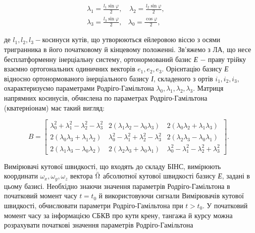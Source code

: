 \[\begin{array}{l} {\lambda_{1} =\frac{l_{1} \sin \varphi }{2} ,\, \, \, \, \, \, 
\lambda_{2} =\frac{l_{2} \sin \varphi }{2} ,\, \, \, \, \, } \\ {\lambda_{3} =
\frac{l_{3} \sin \varphi }{2} ,\, \, \, \, \, \lambda_{0} =\frac{\cos \varphi }{2} 
,} \end{array}\] 

де $l_{1} ,l_{2} ,l_{3} -$косинуси кутів, що утворюються ейлеровою віссю з осями 
тригранника в його початковому й кінцевому положенні. Зв'яжемо з ЛА, що несе бесплатформенну 
інерціальну систему, ортонормований базис \textit{Е} $-$ праву трійку взаємно ортогональних 
одиничних векторів $e_{1} ,e_{2} ,e_{3} .$ Орієнтацію базису \textit{Е} відносно 
ортонормованого інерціального базису \textit{І}, складеного з ортів $i_{1} ,i_{2} 
,i_{3} ,$ охарактеризуємо параметрами Родріго-Гамільтона $\lambda_{0} ,\lambda_{1} 
,\lambda_{2} ,\lambda_{3} .$ Матриця напрямних косинусів, обчислена по параметрах 
Родріго-Гамільтона (кватерніонам) має такий вигляд:

\[B=\left[\begin{array}{ccc} {\lambda_{0}^{2} +\lambda_{1}^{2} -\lambda_{2}^{2} 
-\lambda_{3}^{2} } & {2(\lambda_{1} \lambda_{2} -\lambda_{0} \lambda_{3} )} 
& {2(\lambda_{0} \lambda_{2} +\lambda_{1} \lambda_{3} )} \\ {2(\lambda_{0} \lambda 
_{3} +\lambda_{1} \lambda_{2} )} & {\lambda_{0}^{2} -\lambda_{1}^{2} +\lambda 
_{2}^{2} -\lambda_{3}^{2} } & {2(\lambda_{2} \lambda_{3} -\lambda_{0} \lambda 
_{1} )} \\ {2(\lambda_{1} \lambda_{3} -\lambda_{0} \lambda_{2} )} & {2(\lambda 
_{2} \lambda_{3} +\lambda_{0} \lambda_{1} )} & {\lambda_{0}^{2} -\lambda_{1}^{2} 
-\lambda_{2}^{2} +\lambda_{3}^{2} } \end{array}\right].\] 

Вимірювачі кутової швидкості, що входять до складу БІНС, вимірюють координати $\omega 
_{x} ,\omega_{y} ,\omega_{z} $ вектора $\bar{{\rm \Omega }}$ абсолютної кутової 
швидкості базису \textit{Е}, задані в цьому базисі. Необхідно знаючи значення параметрів 
Родріго-Гамільтона в початковий момент часу $t=t_{0} $ й використовуючи сигнали Вимірювачів 
кутової швидкості, обчислювати параметри Родріго-Гамільтона при $t>t_{0} $. У початковий 
момент часу за інформацією СБКВ про кути крену, тангажа й курсу можна розрахувати 
початкові значення параметрів  Родріго-Гамільтона 

